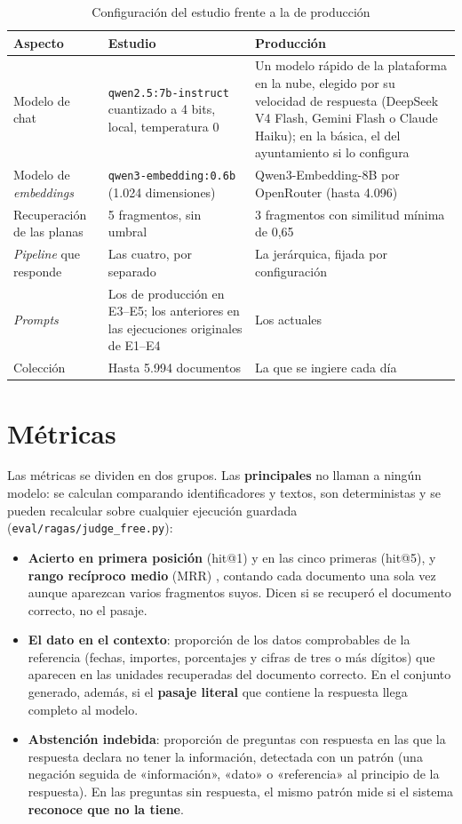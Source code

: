 \begin{table}[htbp]
\centering\small
\caption{Configuración del estudio frente a la de producción}
\label{tab:estudio-produccion}
\begin{tabularx}{\textwidth}{@{}l X X@{}}
\toprule
\textbf{Aspecto} & \textbf{Estudio} & \textbf{Producción} \\
\midrule
Modelo de chat & \texttt{qwen2.5:7b-instruct} cuantizado a 4 bits, local, temperatura 0 & Un modelo rápido de la plataforma en la nube, elegido por su velocidad de respuesta (DeepSeek V4 Flash, Gemini Flash o Claude Haiku); en la básica, el del ayuntamiento si lo configura \\
Modelo de \emph{embeddings} & \texttt{qwen3-embedding:0.6b} (1.024 dimensiones) & Qwen3-Embedding-8B por OpenRouter (hasta 4.096) \\
Recuperación de las planas & 5 fragmentos, sin umbral & 3 fragmentos con similitud mínima de 0,65 \\
\emph{Pipeline} que responde & Las cuatro, por separado & La jerárquica, fijada por configuración \\
\emph{Prompts} & Los de producción en E3--E5; los anteriores en las ejecuciones originales de E1--E4 & Los actuales \\
Colección & Hasta 5.994 documentos & La que se ingiere cada día \\
\bottomrule
\end{tabularx}
\end{table}

\section{Métricas}
\label{sec:metricas}

Las métricas se dividen en dos grupos. Las \textbf{principales} no llaman a ningún modelo: se calculan comparando identificadores y textos, son deterministas y se pueden recalcular sobre cualquier ejecución guardada (\texttt{eval/ragas/judge\_free.py}):

\begin{itemize}
  \item \textbf{Acierto en primera posición} (hit@1) y en las cinco primeras (hit@5), y \textbf{rango recíproco medio} (MRR) \cite{voorhees1999trec}, contando cada documento una sola vez aunque aparezcan varios fragmentos suyos. Dicen si se recuperó el documento correcto, no el pasaje.
  \item \textbf{El dato en el contexto}: proporción de los datos comprobables de la referencia (fechas, importes, porcentajes y cifras de tres o más dígitos) que aparecen en las unidades recuperadas del documento correcto. En el conjunto generado, además, si el \textbf{pasaje literal} que contiene la respuesta llega completo al modelo.
  \item \textbf{Abstención indebida}: proporción de preguntas con respuesta en las que la respuesta declara no tener la información, detectada con un patrón (una negación seguida de «información», «dato» o «referencia» al principio de la respuesta). En las preguntas sin respuesta, el mismo patrón mide si el sistema \textbf{reconoce que no la tiene}.
\end{itemize}

